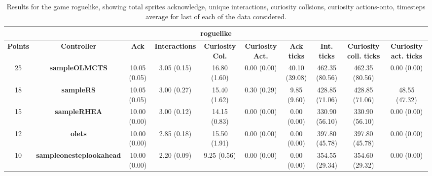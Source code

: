 \begin{table*}[!t]
\begin{center}
\begin{adjustbox}{width=1\textwidth}
\begin{tabular}{|c|c|c|c|c|c|c|c|c|c|}
\multicolumn{10}{c}{\textbf{roguelike}}\\
\hline
\textbf{Points} & \textbf{Controller} & \textbf{Ack} & \textbf{Interactions} & \textbf{Curiosity Col.} & \textbf{Curiosity Act.} & \textbf{Ack ticks} & \textbf{Int. ticks} & \textbf{Curiosity coll. ticks} & \textbf{Curiosity act. ticks}\\
\hline
25 & \textbf{sampleOLMCTS} & 10.05 (0.05) & 3.05 (0.15) & 16.80 (1.60) & 0.00 (0.00) & 40.10 (39.08) & 462.35 (80.56) & 462.35 (80.56) & 0.00 (0.00)
 \\
\hline
18 & \textbf{sampleRS} & 10.05 (0.05) & 3.00 (0.27) & 15.40 (1.62) & 0.30 (0.29) & 9.85 (9.60) & 428.85 (71.06) & 428.85 (71.06) & 48.55 (47.32)
 \\
\hline
15 & \textbf{sampleRHEA} & 10.00 (0.00) & 3.00 (0.12) & 14.15 (0.83) & 0.00 (0.00) & 0.00 (0.00) & 330.90 (56.10) & 330.90 (56.10) & 0.00 (0.00)
 \\
\hline
12 & \textbf{olets} & 10.00 (0.00) & 2.85 (0.18) & 15.50 (1.91) & 0.00 (0.00) & 0.00 (0.00) & 397.80 (45.78) & 397.80 (45.78) & 0.00 (0.00)
 \\
\hline
10 & \textbf{sampleonesteplookahead} & 10.00 (0.00) & 2.20 (0.09) & 9.25 (0.56) & 0.00 (0.00) & 0.00 (0.00) & 354.55 (29.34) & 354.60 (29.32) & 0.00 (0.00)
 \\
\hline
\end{tabular}
\end{adjustbox}
\caption{Results for the game roguelike, showing total sprites acknowledge, unique interactions, curiosity collsions, curiosity actions-onto, timesteps average for last of each of the data considered.}
\label{tab:weights}
\end{center}
\end{table*}
